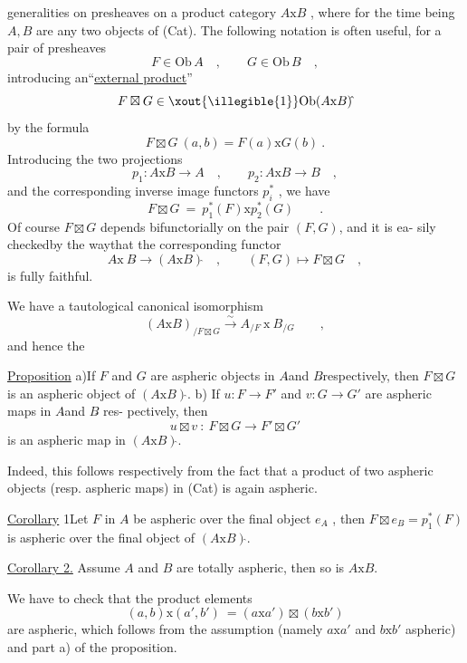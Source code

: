 generalities on presheaves on a product category $A\mathrm{x}B$ , where for the
time being $A,B$ are any two objects of (Cat). The following notation
is often useful, for a pair of presheaves
\[ F\in \mathrm{Ob}\, A\hat{} \quad , \qquad G\in \mathrm{Ob}\, B\hat{} \quad , \]
introducing an``\uline{external product}''
\[ F\boxtimes G \in \xout{\illegible{1}}\mathrm{Ob}(A\mathrm{x}B)\hat{} \]
by the formula
\[ F\boxtimes G\ (a,b) = F(a)\mathrm{x}G(b) \ . \]
Introducing the two projections
\[ p_1 : A\mathrm{x}B \longrightarrow A \quad , \qquad p_2 : A\mathrm{x}B \longrightarrow B \quad , \]
and the corresponding inverse image functors $p_i^{*}$ , we have
\[ F\boxtimes G \ = \ p_1^{*}(F)\mathrm{x}p_2^{*}(G) \qquad . \]
Of course $F\boxtimes G$ depends bifunctorially on the pair $(F,G)$, and it is ea-%
sily checked\hand{,}by the way\hand{,}that the corresponding functor
\[ A\hat{}\mathrm{x}\ B\hat{} \longrightarrow (A\mathrm{x}B)\hat{} \quad , \qquad (F,G)\longmapsto F\boxtimes G \quad , \]
is fully faithful.

We have a tautological canonical isomorphism
\[ (A\mathrm{x}B)_{/F\boxtimes G} \xrightarrow{\sim} A_{/F}\ \mathrm{x}\ B_{/G} \qquad , \]
and hence the

\uline{Proposition}\unsure{\hand{:}} a)If $F$ and $G$ are aspheric objects in $A\hat{}$and $B\hat{}$\hand{/}respectively,
then $F\boxtimes G$ is an aspheric object of $(A\mathrm{x}B)\hat{}$.
b) If $u : F\rightarrow F'$ and $v : G\rightarrow G'$ are aspheric maps in $A\hat{}$and $B\hat{}$ res-%
pectively, then
\[ u\boxtimes v \ : \ F\boxtimes G \rightarrow F'\boxtimes G' \]
is an aspheric map in $(A\mathrm{x}B)\hat{}$.

Indeed, this follows respectively from the fact that a product of
two aspheric objects (resp. aspheric maps) in (Cat) is again aspheric.

\uline{Corollary} 1\unsure{\hand{:}}Let $F$ in $A\hat{}$ be aspheric over the final object $e_{A\hat{}}$ , then
$F\boxtimes e_{B\hat{}} = p_1^{*}(F)$ is aspheric over the final object of $(A\mathrm{x}B)\hat{}$.

\uline{Corollary 2.} Assume $A$ and $B$ are totally aspheric, then so is $A\mathrm{x}B$.

We have to check that the product elements
\[ (a,b)\mathrm{x}(a',b') \ = (a\mathrm{x}a')\boxtimes(b\mathrm{x}b') \]
are aspheric, which follows from the assumption (namely $a\mathrm{x}a'$ and $b\mathrm{x}b'$
aspheric) and part a) of the proposition.

